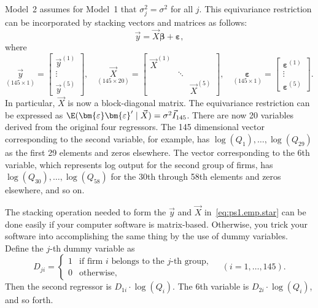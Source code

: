 \begin{problemset}
\begin{enumerate}[label=(\alph*)]
\medskip
Model~2 assumes for Model~1 that $\sigma_j^2 = \sigma^2$ for all $j$.
This equivariance restriction can be incorporated by stacking vectors and
matrices as follows:
%
\[
\vec{y} = \vec{X}\bm{\beta} + \bm{\varepsilon},
\]
%
where
%
\begin{equation}
\underset{(145 \times 1)}{\vec{y}}
= \begin{bmatrix} \vec{y}^{(1)} \\ \vdots \\ \vec{y}^{(5)} \end{bmatrix}, \quad
\underset{(145 \times 20)}{\vec{X}}
= \begin{bmatrix} \vec{X}^{(1)} & & \\ & \ddots & \\ & & \vec{X}^{(5)} \end{bmatrix}, \quad
\underset{(145 \times 1)}{\bm{\varepsilon}}
= \begin{bmatrix} \bm{\varepsilon}^{(1)} \\ \vdots \\ \bm{\varepsilon}^{(5)} \end{bmatrix}.
\tag{$*$} \label{eq:ps1.emp.star}
\end{equation}
%
In particular, $\vec{X}$ is now a block-diagonal matrix. The equivariance
restriction can be expressed as
$\E(\bm{\varepsilon}\bm{\varepsilon}' \mid \vec{X}) = \sigma^2 \vec{I}_{145}$.
There are now 20 variables derived from the original four regressors. The
145 dimensional vector corresponding to the second variable, for example,
has $\log(Q_1), \ldots, \log(Q_{29})$ as the first 29 elements and zeros
elsewhere. The vector corresponding to the 6th variable, which represents
log output for the second group of firms, has $\log(Q_{30}), \ldots,
\log(Q_{58})$ for the 30th through 58th elements and zeros elsewhere, and
so on.

The stacking operation needed to form the $\vec{y}$ and $\vec{X}$
in~\eqref{eq:ps1.emp.star} can be done easily if your computer software is
matrix-based. Otherwise, you trick your software into accomplishing the same
thing by the use of dummy variables. Define the $j$-th dummy variable as
%
\[
D_{ji} = \begin{cases}
1 & \text{if firm } i \text{ belongs to the } j\text{-th group}, \\
0 & \text{otherwise},
\end{cases}
\quad (i = 1, \ldots, 145).
\]
%
Then the second regressor is $D_{1i} \cdot \log(Q_i)$. The 6th variable is
$D_{2i} \cdot \log(Q_i)$, and so forth.


\end{enumerate}
\end{problemset}
